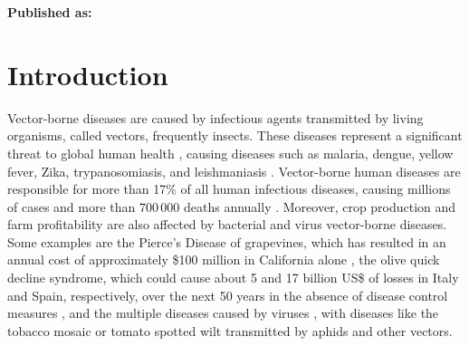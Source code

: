 \vspace{3cm}






\textbf{Published as:}

\vspace{0.5cm}


\newpage
\section{Introduction}\label{sec:intro}

Vector-borne diseases are caused by infectious agents transmitted by living
organisms, called vectors,  frequently insects. These diseases represent a
significant threat to global human health \cite{Athni_2020}, causing diseases
such as malaria, dengue, yellow fever, Zika, trypanosomiasis, and leishmaniasis
\cite{SCHUMACHER2018352}. Vector-borne human diseases are responsible for more
than 17\% of all human infectious diseases, causing millions of cases and more
than $700\,000$ deaths annually \cite{WHO}. Moreover, crop production and farm
profitability are also affected by bacterial \cite{HUANG20201379} and virus
\cite{Bragard2013} vector-borne diseases. Some examples are the Pierce's
Disease of grapevines, which has resulted in an annual cost of approximately
\$100 million in California alone \cite{Tumber2014}, the olive quick
decline syndrome, which could cause about 5 and 17 billion US\$ of losses in
Italy and Spain, respectively, over the next 50 years in the absence of disease
control measures \cite{Schneider2020}, and the multiple diseases caused by
viruses \cite{Rybicki2015}, with diseases like the tobacco mosaic or tomato
spotted wilt transmitted by aphids and other vectors.

